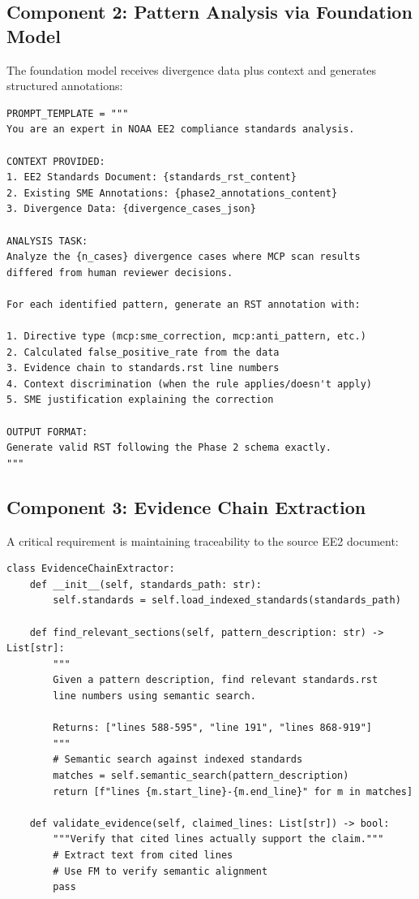 \documentclass[11pt,a4paper]{article}
\begin{document}
\subsection{Component 2: Pattern Analysis via Foundation Model}

The foundation model receives divergence data plus context and generates structured annotations:

\begin{lstlisting}[style=python, caption={FM Prompt Structure}]
PROMPT_TEMPLATE = """
You are an expert in NOAA EE2 compliance standards analysis.

CONTEXT PROVIDED:
1. EE2 Standards Document: {standards_rst_content}
2. Existing SME Annotations: {phase2_annotations_content}
3. Divergence Data: {divergence_cases_json}

ANALYSIS TASK:
Analyze the {n_cases} divergence cases where MCP scan results 
differed from human reviewer decisions.

For each identified pattern, generate an RST annotation with:

1. Directive type (mcp:sme_correction, mcp:anti_pattern, etc.)
2. Calculated false_positive_rate from the data
3. Evidence chain to standards.rst line numbers
4. Context discrimination (when the rule applies/doesn't apply)
5. SME justification explaining the correction

OUTPUT FORMAT:
Generate valid RST following the Phase 2 schema exactly.
"""
\end{lstlisting}

\subsection{Component 3: Evidence Chain Extraction}

A critical requirement is maintaining traceability to the source EE2 document:

\begin{lstlisting}[style=python, caption={Evidence Chain Generator}]
class EvidenceChainExtractor:
    def __init__(self, standards_path: str):
        self.standards = self.load_indexed_standards(standards_path)
    
    def find_relevant_sections(self, pattern_description: str) -> List[str]:
        """
        Given a pattern description, find relevant standards.rst 
        line numbers using semantic search.
        
        Returns: ["lines 588-595", "line 191", "lines 868-919"]
        """
        # Semantic search against indexed standards
        matches = self.semantic_search(pattern_description)
        return [f"lines {m.start_line}-{m.end_line}" for m in matches]
    
    def validate_evidence(self, claimed_lines: List[str]) -> bool:
        """Verify that cited lines actually support the claim."""
        # Extract text from cited lines
        # Use FM to verify semantic alignment
        pass
\end{lstlisting}
\end{document}
